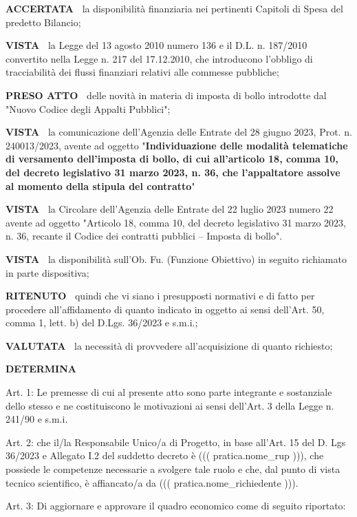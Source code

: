 \textbf{ACCERTATA~}	la disponibilità finanziaria nei pertinenti
Capitoli di Spesa del predetto Bilancio;

\textbf{VISTA~}	la Legge del 13 agosto 2010 numero 136	e il
D.L. n. 187/2010 convertito nella Legge n. 217 del 17.12.2010, che
introducono l’obbligo di tracciabilità dei flussi finanziari relativi
alle commesse pubbliche;

\textbf{PRESO ATTO~} delle novità in materia di imposta di bollo introdotte dal "Nuovo Codice degli Appalti Pubblici";

\textbf{VISTA~}	la comunicazione dell’Agenzia delle Entrate del 28
giugno 2023,  Prot. n. 240013/2023,  avente ad oggetto	"\textbf{Individuazione
delle modalità telematiche di versamento dell’imposta di bollo, di cui
all’articolo 18, comma 10, del decreto legislativo 31 marzo 2023, n. 36,
che l’appaltatore assolve al momento della stipula del contratto}"

\textbf{VISTA~}	la Circolare dell’Agenzia delle Entrate del 22 luglio
2023 numero 22 avente ad oggetto "Articolo 18, comma 10, del decreto
legislativo 31 marzo 2023, n. 36, recante il Codice dei contratti pubblici
– Imposta di bollo".

\textbf{VISTA~}	la disponibilità sull’Ob. Fu. (Funzione Obiettivo)
in seguito richiamato in parte dispositiva;

\textbf{RITENUTO~} quindi che vi siano i presupposti normativi e
di fatto per procedere all’affidamento di quanto indicato in oggetto
ai sensi dell’Art. 50, comma 1, lett. b) del D.Lgs. 36/2023 e s.m.i.;

\textbf{VALUTATA~} la necessità di provvedere all’acquisizione
di quanto richiesto;

\begin{center}
	\textbf{DETERMINA}
\end{center}

Art. 1: Le premesse di cui al presente atto sono parte integrante e
sostanziale dello stesso e ne costituiscono le motivazioni ai sensi
dell’Art. 3 della Legge n. 241/90 e s.m.i.

Art. 2: che il/la Responsabile Unico/a di Progetto, in base all’Art. 15 del
D. Lgs 36/2023 e Allegato I.2 del suddetto decreto è ((( pratica.nome_rup ))),
che possiede le competenze necessarie a svolgere tale ruolo
e che, dal punto di vista tecnico scientifico, è affiancato/a da
((( pratica.nome_richiedente ))).

Art. 3: Di aggiornare e approvare il quadro economico come di seguito riportato:

